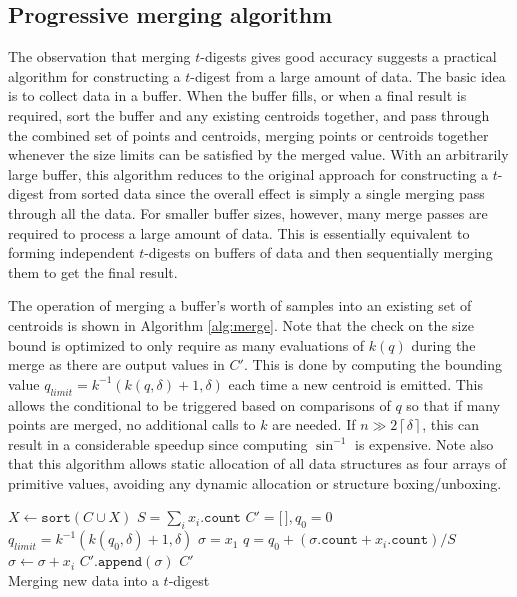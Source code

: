 \documentclass[11pt]{amsart}
\begin{document}
\subsection{Progressive merging algorithm}
The observation that merging $t$-digests gives good accuracy suggests a practical algorithm for constructing a $t$-digest from a large amount of data. The basic idea is to collect data in a buffer. When the buffer fills, or when a final result is required, sort the buffer and any existing centroids together, and pass through the combined set of points and centroids, merging points or centroids together whenever the size limits can be satisfied by the merged value. With an arbitrarily large buffer, this algorithm reduces to the original approach for constructing a $t$-digest from sorted data since the overall effect is simply a single merging pass through all the data. For smaller buffer sizes, however, many merge passes are required to process a large amount of data. This is essentially equivalent to forming independent $t$-digests on buffers of data and then sequentially merging them to get the final result.

The operation of merging a buffer's worth of samples into an existing set of centroids is shown in Algorithm \ref{alg:merge}. Note that the check on the size bound is optimized to only require as many evaluations of $k(q)$ during the merge as there are output values in $C'$. This is done by computing the bounding value $q_{limit} = k^{-1}(k(q, \delta) + 1, \delta)$ each time a new centroid is emitted. This allows the conditional to be triggered based on comparisons of $q$ so that if many points are merged, no additional calls to $k$ are needed. If $n \gg 2 \left \lceil \delta \right \rceil$, this can result in a considerable speedup since computing $\sin^{-1}$ is expensive. Note also that this algorithm allows static allocation of all data structures as four arrays of primitive values, avoiding any dynamic allocation or structure boxing/unboxing.
\begin{algorithm}[ht]
 \label{alg:merge}
\SetNoFillComment
{}
$X \gets \mathtt{sort}(C \cup X)$\;
$ S = \sum_i x_i.\mathtt{count}$\;
$C' = \lbrack \, \rbrack, q_0 = 0$\;
$q_{limit}=k^{-1}(k(q_0, \delta)+1, \delta)$\;
$\sigma = x_1$\;
 {
  $q = q_0 + (\sigma.\mathtt{count} + x_i.\mathtt{count})/S$\;
   {
      $\sigma \gets \sigma + x_i$\;
  } 
} 
$C'\mathtt{.append}(\sigma)$\;
\Return $ C' $\\
\caption{Merging new data into a $t$-digest}
\end{algorithm}
\end{document}

